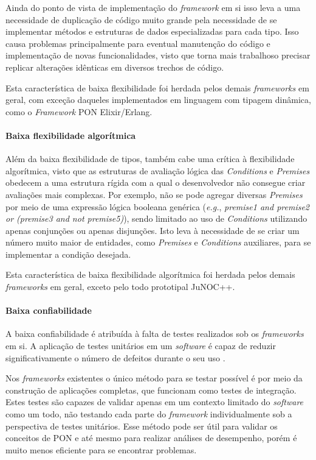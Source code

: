 Ainda do ponto de vista de implementação do \textit{framework} em si isso leva a
uma necessidade de duplicação de código muito grande pela necessidade de se
implementar métodos e estruturas de dados especializadas para cada tipo. Isso
causa problemas principalmente para eventual manutenção do código e
implementação de novas funcionalidades, visto que torna mais trabalhoso precisar
replicar alterações idênticas em diversos trechos de código.

Esta característica de baixa flexibilidade foi herdada pelos demais
\textit{frameworks} em geral, com exceção daqueles implementados em linguagem
com tipagem dinâmica, como o \textit{Framework} PON Elixir/Erlang.

\paragraph*{Baixa flexibilidade algorítmica}

Além da baixa flexibilidade de tipos, também cabe uma crítica à flexibilidade
algorítmica, visto que as estruturas de avaliação lógica das \textit{Conditions}
e \textit{Premises} obedecem a uma estrutura rígida com a qual o desenvolvedor
não consegue criar avaliações mais complexas. Por exemplo, não se pode agregar
diversas \textit{Premises} por meio de uma expressão lógica booleana genérica
(\textit{e.g.}, \textit{premise1 and premise2 or (premise3 and not premise5)}),
sendo limitado ao uso de \textit{Conditions} utilizando apenas conjunções ou
apenas disjunções. Isto leva à necessidade de se criar um número muito maior de
entidades, como \textit{Premises} e \textit{Conditions} auxiliares, para se
implementar a condição desejada.

Esta característica de baixa flexibilidade algorítmica foi herdada pelos demais
\textit{frameworks} em geral, exceto pelo todo prototipal JuNOC++.

\paragraph*{Baixa confiabilidade}

A baixa confiabilidade é atribuída à falta de testes realizados sob os
\textit{frameworks} em si. A aplicação de testes unitários em um
\textit{software} é capaz de reduzir significativamente o número de defeitos
durante o seu uso \cite{microsoft_test_2009}.

Nos \textit{frameworks} existentes o único método para se testar possível é por
meio da construção de aplicações completas, que funcionam como testes de
integração. Estes testes são capazes de validar apenas em um contexto limitado
do \textit{software} como um todo, não testando cada parte do \textit{framework}
individualmente sob a perspectiva de testes unitários. Esse método pode ser útil
para validar os conceitos de PON e até mesmo para realizar análises de
desempenho, porém é muito menos eficiente para se encontrar problemas.

